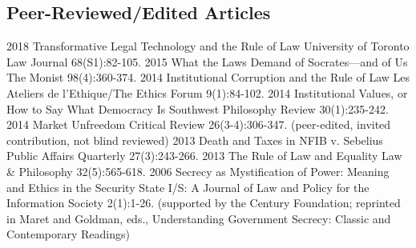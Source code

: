 \documentclass[letterpaper]{moderncv}
\begin{document}
\subsection{Peer-Reviewed/Edited Articles}
\cventry
{2018}
{Transformative Legal Technology and the Rule of Law}
{}
{University of Toronto Law Journal}
{}
{68(S1):82-105. }
\vspace{1mm}
\cventry
{2015}
{What the Laws Demand of Socrates---and of Us}
{}
{The Monist}
{}
{98(4):360-374. }
\vspace{1mm}
\cventry
{2014}
{Institutional Corruption and the Rule of Law}
{}
{Les Ateliers de l'Ethique/The Ethics Forum}
{}
{9(1):84-102. }
\vspace{1mm}
\cventry
{2014}
{Institutional Values, or How to Say What Democracy Is}
{}
{Southwest Philosophy Review}
{}
{30(1):235-242. }
\vspace{1mm}
\cventry
{2014}
{Market Unfreedom}
{}
{Critical Review}
{}
{26(3-4):306-347. (peer-edited, invited contribution, not blind reviewed)}
\vspace{1mm}
\cventry
{2013}
{Death and Taxes in NFIB v. Sebelius}
{}
{Public Affairs Quarterly}
{}
{27(3):243-266. }
\vspace{1mm}
\cventry
{2013}
{The Rule of Law and Equality}
{}
{Law \& Philosophy}
{}
{32(5):565-618. }
\vspace{1mm}
\cventry
{2006}
{Secrecy as Mystification of Power: Meaning and Ethics in the Security State}
{}
{I/S: A Journal of Law and Policy for the Information Society}
{}
{2(1):1-26. (supported by the Century Foundation; reprinted in Maret and Goldman, eds., Understanding Government Secrecy: Classic and Contemporary Readings)}
\vspace{1mm}
\vspace{1mm}
\end{document}
